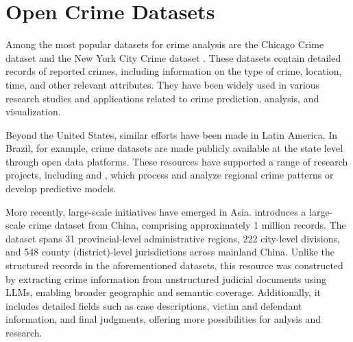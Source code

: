 




\section{Open Crime Datasets}

Among the most popular datasets for crime analysis are the Chicago Crime dataset \citep{ChicagoDataset} and the New York City Crime dataset \citep{NYCDataset}. These datasets contain detailed records of reported crimes, including information on the type of crime, location, time, and other relevant attributes. They have been widely used in various research studies and applications related to crime prediction, analysis, and visualization.

Beyond the United States, similar efforts have been made in Latin America. In Brazil, for example, crime datasets are made publicly available at the state level through open data platforms. These resources have supported a range of research projects, including \citep{Garcia2022CriPAV} and \citep{Waqar2025CrimePredictionGNN}, which process and analyze regional crime patterns or develop predictive models.

More recently, large-scale initiatives have emerged in Asia. \citep{Zhang2025CrimeDatasetChina} introduces a large-scale crime dataset from China, comprising approximately 1 million records. The dataset spans 31 provincial-level administrative regions, 222 city-level divisions, and 548 county (district)-level jurisdictions across mainland China. Unlike the structured records in the aforementioned datasets, this resource was constructed by extracting crime information from unstructured judicial documents using LLMs, enabling broader geographic and semantic coverage. Additionally, it includes detailed fields such as case descriptions, victim and defendant information, and final judgments, offering more possibilities for anlysis and research.



